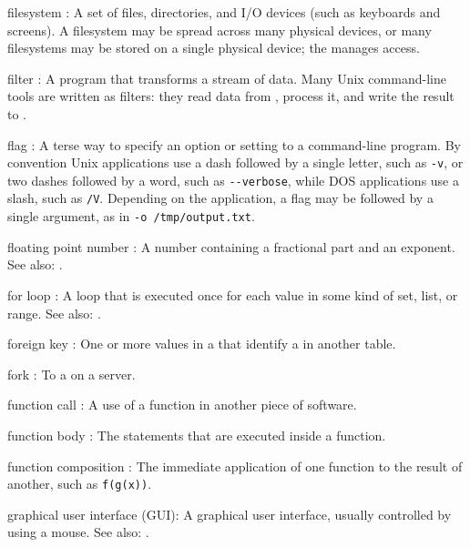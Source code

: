 \documentclass{book}
\begin{document}
\begin{swcdescription}
\item[filesystem]:
A set of files, directories, and I/O devices (such
as keyboards and screens). A filesystem may be spread across many
physical devices, or many filesystems may be stored on a single physical
device; the  manages
access.

\item[filter]:
A program that transforms a stream of data. Many Unix
command-line tools are written as filters: they read data from
, process it, and write the
result to .

\item[flag]:
A terse way to specify an option or setting to a
command-line program. By convention Unix applications use a dash
followed by a single letter, such as \texttt{-v}, or two dashes followed
by a word, such as \texttt{-{}-verbose}, while DOS applications use a
slash, such as \texttt{/V}. Depending on the application, a flag may be
followed by a single argument, as in \texttt{-o /tmp/output.txt}.

\item[floating point number]:
A number containing a fractional
part and an exponent. See also: .

\item[for loop]:
A loop that is executed once for each value in some
kind of set, list, or range. See also: .

\item[foreign key]:
One or more values in a
 that identify a
 in another table.

\item[fork]:
To  a  
on a server.

\item[function call]:
A use of a function in another piece of
software.

\item[function body]:
The statements that are executed inside a
function.

\item[function composition]:
The immediate application of one function
to the result of another, such as \texttt{f(g(x))}.

\item[graphical user interface] (GUI):
A graphical user interface,
usually controlled by using a mouse. See also:
.


\end{swcdescription}
\end{document}
